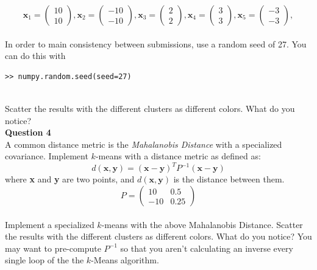 \documentclass[paper=a4, fontsize=11pt]{scrartcl} %
\begin{document}
\begin{equation}
\textbf{x}_1 = \left( \begin{matrix} 10 \\ 10 \end{matrix} \right), \textbf{x}_2 = \left( \begin{matrix} -10 \\ -10 \end{matrix} \right),
\textbf{x}_3 = \left( \begin{matrix} 2 \\ 2 \end{matrix} \right),
\textbf{x}_4 = \left( \begin{matrix} 3 \\ 3 \end{matrix} \right),
\textbf{x}_5 = \left( \begin{matrix} -3 \\ -3 \end{matrix} \right),
\end{equation} \\

In order to main consistency between submissions, use a random seed of 27. You can do this with \\

\begin{verbatim}
>> numpy.random.seed(seed=27)
\end{verbatim} \\

Scatter the results with the different clusters as different colors. What do you notice? \\

\textbf{Question 4} \\

A common distance metric is the \emph{Mahalanobis Distance} with a specialized covariance. Implement $k$-means with a distance metric as defined as: \\

\begin{equation}
d(\textbf{x}, \textbf{y}) = ( \textbf{x} - \textbf{y} )^T P^{-1} ( \textbf{x} - \textbf{y} )
\end{equation}
where \textbf{x} and \textbf{y} are two points, and $d(\textbf{x}, \textbf{y})$ is the distance between them. \\

\begin{equation}
 P = \left(
\begin{matrix}
10 & 0.5 \\
-10 & 0.25
\end{matrix}
\right)
\end{equation}
\\
Implement a specialized $k$-means with the above Mahalanobis Distance. Scatter the results with the different clusters as different colors. What do you notice? You may want to pre-compute $P^{-1}$ so that you aren't calculating an inverse every single loop of the the $k$-Means algorithm.
\end{document}
